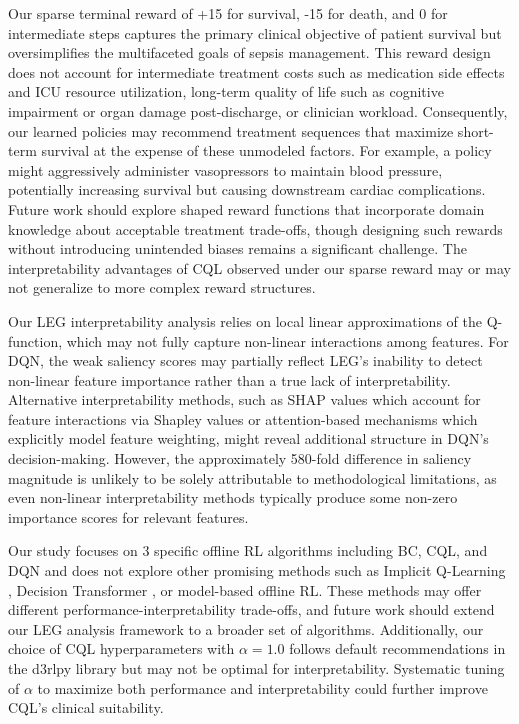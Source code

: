 Our sparse terminal reward of +15 for survival, -15 for death, and 0 for intermediate steps captures the primary clinical objective of patient survival but oversimplifies the multifaceted goals of sepsis management. This reward design does not account for intermediate treatment costs such as medication side effects and ICU resource utilization, long-term quality of life such as cognitive impairment or organ damage post-discharge, or clinician workload. Consequently, our learned policies may recommend treatment sequences that maximize short-term survival at the expense of these unmodeled factors. For example, a policy might aggressively administer vasopressors to maintain blood pressure, potentially increasing survival but causing downstream cardiac complications. Future work should explore shaped reward functions that incorporate domain knowledge about acceptable treatment trade-offs, though designing such rewards without introducing unintended biases remains a significant challenge. The interpretability advantages of CQL observed under our sparse reward may or may not generalize to more complex reward structures.

Our LEG interpretability analysis relies on local linear approximations of the Q-function, which may not fully capture non-linear interactions among features. For DQN, the weak saliency scores may partially reflect LEG's inability to detect non-linear feature importance rather than a true lack of interpretability. Alternative interpretability methods, such as SHAP values \citep{lundberg2017shap} which account for feature interactions via Shapley values or attention-based mechanisms which explicitly model feature weighting, might reveal additional structure in DQN's decision-making. However, the approximately 580-fold difference in saliency magnitude is unlikely to be solely attributable to methodological limitations, as even non-linear interpretability methods typically produce some non-zero importance scores for relevant features.

Our study focuses on 3 specific offline RL algorithms including BC, CQL, and DQN and does not explore other promising methods such as Implicit Q-Learning \citep{kostrikov2021iql}, Decision Transformer \citep{chen2021decision_transformer}, or model-based offline RL. These methods may offer different performance-interpretability trade-offs, and future work should extend our LEG analysis framework to a broader set of algorithms. Additionally, our choice of CQL hyperparameters with $\alpha = 1.0$ follows default recommendations in the d3rlpy library but may not be optimal for interpretability. Systematic tuning of $\alpha$ to maximize both performance and interpretability could further improve CQL's clinical suitability.

